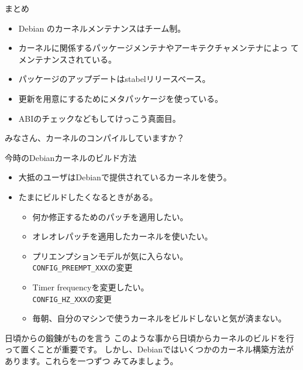 \begin{frame}[containsverbatim]{まとめ}
\begin{itemize}
\item Debian のカーネルメンテナンスはチーム制。
\item カーネルに関係するパッケージメンテナやアーキテクチャメンテナによっ
      てメンテナンスされている。
\item パッケージのアップデートはstabelリリースベース。
\item 更新を用意にするためにメタパッケージを使っている。
\item ABIのチェックなどもしてけっこう真面目。
\end{itemize}
\end{frame}


\begin{frame}[containsverbatim]
みなさん、カーネルのコンパイルしていますか？
\end{frame}


\begin{frame}[containsverbatim]{今時のDebianカーネルのビルド方法}

\begin{itemize}
\item 大抵のユーザはDebianで提供されているカーネルを使う。
\item たまにビルドしたくなるときがある。

\begin{itemize}
\item 何か修正するためのパッチを適用したい。
\item オレオレパッチを適用したカーネルを使いたい。
\item プリエンプションモデルが気に入らない。\\
\texttt{CONFIG\_PREEMPT\_XXX}の変更
\item Timer frequencyを変更したい。\\
\texttt{CONFIG\_HZ\_XXX}の変更
\item 毎朝、自分のマシンで使うカーネルをビルドしないと気が済まない。
\end{itemize}
\end{itemize}
\end{frame}

\begin{frame}[containsverbatim]{日頃からの鍛錬がものを言う}
このような事から日頃からカーネルのビルドを行って置くことが重要です。
しかし、Debianではいくつかのカーネル構築方法があります。これらを一つずつ
みてみましょう。
\end{frame}


